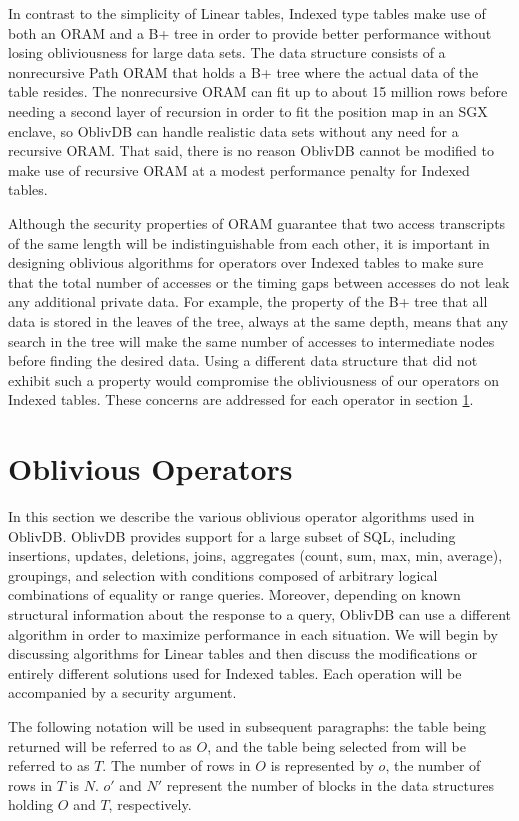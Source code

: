 \documentclass[conference]{IEEEtran}
\def\name/{OblivDB}
\begin{document}
In contrast to the simplicity of Linear tables, Indexed type tables make use of both an ORAM and a B+ tree in order to provide better performance without losing obliviousness for large data sets. The data structure consists of a nonrecursive Path ORAM that holds a B+ tree where the actual data of the table resides. The nonrecursive ORAM can fit up to about 15 million rows before needing a second layer of recursion in order to fit the position map in an SGX enclave, so \name/ can handle realistic data sets without any need for a recursive ORAM. That said, there is no reason \name/ cannot be modified to make use of recursive ORAM at a modest performance penalty for Indexed tables. 

Although the security properties of ORAM guarantee that two access transcripts of the same length will be indistinguishable from each other, it is important in designing oblivious algorithms for operators over Indexed tables to make sure that the total number of accesses or the timing gaps between accesses do not leak any additional private data. For example, the property of the B+ tree that all data is stored in the leaves of the tree, always at the same depth, means that any search in the tree will make the same number of accesses to intermediate nodes before finding the desired data. Using a different data structure that did not exhibit such a property would compromise the obliviousness of our operators on Indexed tables. These concerns are addressed for each operator in section \ref{oblivOps}. 

\section{Oblivious Operators}\label{oblivOps}
In this section we describe the various oblivious operator algorithms used in \name/. \name/ provides support for a large subset of SQL, including insertions, updates, deletions, joins, aggregates (count, sum, max, min, average), groupings, and selection with conditions composed of arbitrary logical combinations of equality or range queries. Moreover, depending on known structural information about the response to a query, \name/ can use a different algorithm in order to maximize performance in each situation. We will begin by discussing algorithms for Linear tables and then discuss the modifications or entirely different solutions used for Indexed tables. Each operation will be accompanied by a security argument. 

The following notation will be used in subsequent paragraphs: the table being returned will be referred to as $O$, and the table being selected from will be referred to as $T$. The number of rows in $O$ is represented by $o$, the number of rows in $T$ is $N$. $o'$ and $N'$ represent the number of blocks in the data structures holding $O$ and $T$, respectively. 
\end{document}
